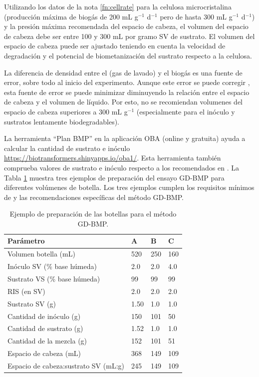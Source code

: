 \documentclass[]{article}
\begin{document}
Utilizando los datos de la nota \ref{fn:cellrate} para la celulosa microcristalina (producción máxima de biogás de 200 mL g$^{-1}$ d$^{-1}$ pero de hasta 300 mL g$^{-1}$ d$^{-1}$) y la presión máxima recomendada del espacio de cabeza, el volumen del espacio de cabeza debe ser entre 100 y 300 mL por gramo SV de sustrato. 
El volumen del espacio de cabeza puede ser ajustado teniendo en cuenta la velocidad de degradación y el potencial de biometanización del sustrato respecto a la celulosa.

La diferencia de densidad entre el  (gas de lavado) y el biogás es una fuente de error, sobre todo al inicio del experimento. Aunque este error se puede corregir \citep{justesenDevelopmentValidationLowcost2019}, esta fuente de error se puede minimizar diminuyendo la relación entre el espacio de cabeza y el volumen de líquido. Por esto, no se recomiendan volumenes del espacio de cabeza superiores a 300 mL g$^{-1}$ (especialmente para el inóculo y sustratos lentamente biodegradables).

La herramienta ``Plan BMP'' en la aplicación OBA (online y gratuita) ayuda a calcular la cantidad de sustrato e inóculo \url{https://biotransformers.shinyapps.io/oba1/}.
Esta herramienta también comprueba valores de sustrato e inóculo respecto a los recomendados en  \citet{holligerStandardizationBiomethanePotential2016}.
La Tabla \ref{tab:examples} muestra tres ejemplos de preparación del ensayo GD-BMP para diferentes volúmenes de botella. Los tres ejemplos cumplen los requisitos mínimos de \citet{holligerStandardizationBiomethanePotential2016} y las recomendaciones específicas del método GD-BMP.

\begin{table}[h] 
\centering
\caption{Ejemplo de preparación de las botellas para el método GD-BMP.}
\label{tab:examples}
\begin{tabular}{llll}
\hline
Parámetro                     & A    & B   & C   \\
\hline
Volumen botella (mL)      & 520  & 250 & 160 \\
Inóculo SV (\% base húmeda)           & 2.0  & 2.0 & 4.0 \\
Sustrato VS (\% base húmeda)          & 99   & 99  & 99  \\
RIS (en SV)                & 2.0  & 2.0 & 2.0 \\
Sustrato SV (g)              & 1.50 & 1.0 & 1.0 \\
Cantidad de inóculo (g)               & 150  & 101 & 50  \\
Cantidad de sustrato (g)              & 1.52 & 1.0 & 1.0 \\
Cantidad de la mezcla (g)                & 152  & 101 & 51  \\
Espacio de cabeza (mL)         & 368  & 149 & 109 \\
Espacio de cabeza:sustrato SV (mL:g) & 245  & 149 & 109 \\
\hline
\end{tabular}
\end{table}
\end{document}
